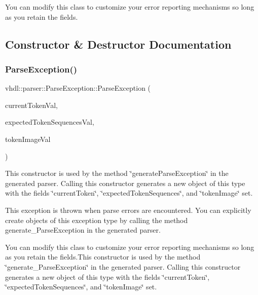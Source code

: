 You can modify this class to customize your error reporting mechanisms so long as you retain the fields. 

\subsection{Constructor \& Destructor Documentation}
\mbox{\label{classvhdl_1_1parser_1_1_parse_exception_aa1560102101159dc8718a4a163cc200b}} 
\subsubsection{\texorpdfstring{ParseException()}{ParseException()}\hspace{0.1cm}{\footnotesize\ttfamily [1/3]}}
{\footnotesize\ttfamily vhdl\+::parser\+::\+Parse\+Exception\+::\+Parse\+Exception (\begin{DoxyParamCaption}\item[{\mbox{\hyperlink{classvhdl_1_1parser_1_1_token}{Token}}}]{current\+Token\+Val,  }\item[{int $\ast$$\ast$}]{expected\+Token\+Sequences\+Val,  }\item[{J\+A\+V\+A\+C\+C\+\_\+\+S\+T\+R\+I\+N\+G\+\_\+\+T\+Y\+PE $\ast$}]{token\+Image\+Val }\end{DoxyParamCaption})}

This constructor is used by the method \char`\"{}generate\+Parse\+Exception\char`\"{} in the generated parser. Calling this constructor generates a new object of this type with the fields \char`\"{}current\+Token\char`\"{}, \char`\"{}expected\+Token\+Sequences\char`\"{}, and \char`\"{}token\+Image\char`\"{} set.

This exception is thrown when parse errors are encountered. You can explicitly create objects of this exception type by calling the method generate\+\_\+\+Parse\+Exception in the generated parser.

You can modify this class to customize your error reporting mechanisms so long as you retain the fields.\+This constructor is used by the method \char`\"{}generate\+\_\+\+Parse\+Exception\char`\"{} in the generated parser. Calling this constructor generates a new object of this type with the fields \char`\"{}current\+Token\char`\"{}, \char`\"{}expected\+Token\+Sequences\char`\"{}, and \char`\"{}token\+Image\char`\"{} set. \mbox{\label{classvhdl_1_1parser_1_1_parse_exception_aa8dbc5d8f42a4cc3375d7d21340dc95e}} 
